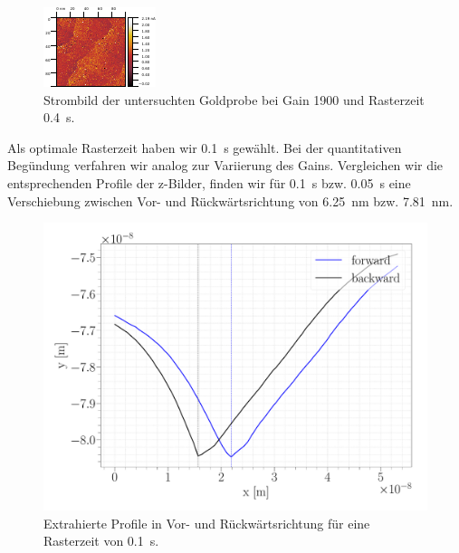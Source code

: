 \begin{figure}[H]
\centering
\includegraphics[width=\textwidth]{../Gwyddion/Gold/TIME_04_I_forward.pdf}
\caption{Strombild der untersuchten Goldprobe bei Gain 1900 und Rasterzeit \SI{0.4}{s}.}
\label{TIME_04_I}
\end{figure}

Als optimale Rasterzeit haben wir \SI{0,1}{s} gewählt. Bei der quantitativen Begündung verfahren wir analog zur Variierung des Gains. Vergleichen wir die entsprechenden Profile der z-Bilder, finden wir für \SI{0,1}{s} bzw. \SI{0,05}{s} eine Verschiebung zwischen Vor- und Rückwärtsrichtung von \SI{6,25}{nm} bzw. \SI{7,81}{nm}.

\begin{figure}[H]
\centering
\includegraphics[width=\textwidth]{../Figures/TIME_01_profile.pdf}
\caption{Extrahierte Profile in Vor- und Rückwärtsrichtung für eine Rasterzeit von \SI{0.1}{s}.}
\label{TIME_01_profile}
\end{figure}

